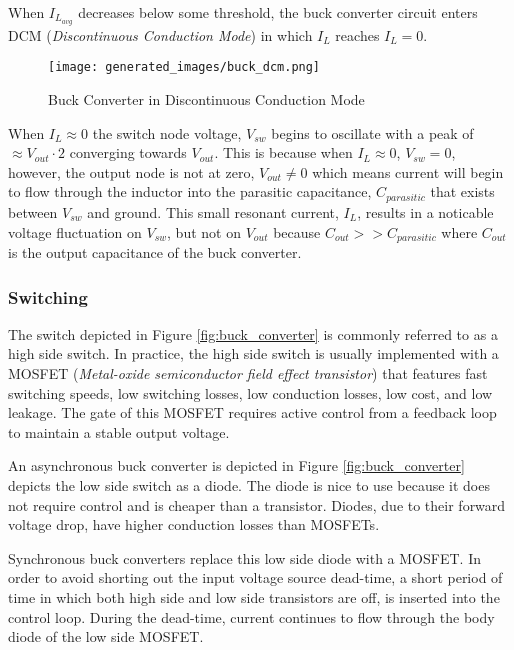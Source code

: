 \documentclass[main.tex]{subfiles}
\begin{document}
When $I_{L_{avg}}$ decreases below some threshold, the buck converter circuit enters DCM (\textit{Discontinuous Conduction Mode}) in which $I_L$ reaches $I_L = 0$.

\begin{figure}[H]
    \centering
    \texttt{[image: generated\_images/buck\_dcm.png]}
    \caption{Buck Converter in Discontinuous Conduction Mode}
    \label{fig:buck-dcm}
\end{figure}

When $I_L \approx 0$ the switch node voltage, $V_{sw}$ begins to oscillate with a peak of $\approx V_{out} \cdot 2$ converging towards $V_{out}$. This is because when $I_L \approx 0$, $V_{sw} = 0$, however, the output node is not at zero, $V_{out} \neq 0$ which means current will begin to flow through the inductor into the parasitic capacitance, $C_{parasitic}$ that exists between $V_{sw}$ and ground. This small resonant current, $I_L$, results in a noticable voltage fluctuation on $V_{sw}$, but not on $V_{out}$ because $C_{out} >> C_{parasitic}$ where $C_{out}$ is the output capacitance of the buck converter. 

\subsubsection{Switching}
The switch depicted in Figure \ref{fig:buck_converter} is commonly referred to as a high side switch. In practice, the high side switch is usually implemented with a MOSFET (\textit{Metal-oxide semiconductor field effect transistor}) that features fast switching speeds, low switching losses, low conduction losses, low cost, and low leakage. The gate of this MOSFET requires active control from a feedback loop to maintain a stable output voltage. \newline

\newnoindentpara An asynchronous buck converter is depicted in Figure \ref{fig:buck_converter} depicts the low side switch as a diode. The diode is nice to use because it does not require control and is cheaper than a transistor. Diodes, due to their forward voltage drop, have higher conduction losses than MOSFETs. \newline

\newnoindentpara Synchronous buck converters replace this low side diode with a MOSFET. In order to avoid shorting out the input voltage source dead-time, a short period of time in which both high side and low side transistors are off, is inserted into the control loop. During the dead-time, current continues to flow through the body diode of the low side MOSFET. 
\end{document}
